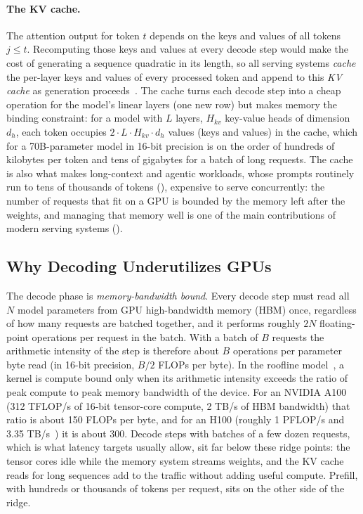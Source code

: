 \paragraph{The KV cache.}
The attention output for token $t$ depends on the keys and values of all tokens $j \le t$.
Recomputing those keys and values at every decode step would make the cost of generating a sequence quadratic in its length, so all serving systems \emph{cache} the per-layer keys and values of every processed token and append to this \emph{KV cache} as generation proceeds~\cite{pope2023efficiently,vllm}.
The cache turns each decode step into a cheap operation for the model's linear layers (one new row) but makes memory the binding constraint: for a model with $L$ layers, $H_{kv}$ key-value heads of dimension $d_h$, each token occupies $2 \cdot L \cdot H_{kv} \cdot d_h$ values (keys and values) in the cache, which for a 70B-parameter model in 16-bit precision is on the order of hundreds of kilobytes per token and tens of gigabytes for a batch of long requests.
The cache is also what makes long-context and agentic workloads, whose prompts routinely run to tens of thousands of tokens (), expensive to serve concurrently: the number of requests that fit on a GPU is bounded by the memory left after the weights, and managing that memory well is one of the main contributions of modern serving systems ().

\subsection{Why Decoding Underutilizes GPUs}
\label{background:subsec:memory_bound}

The decode phase is \emph{memory-bandwidth bound}.
Every decode step must read all $N$ model parameters from GPU high-bandwidth memory (HBM) once, regardless of how many requests are batched together, and it performs roughly $2N$ floating-point operations per request in the batch.
With a batch of $B$ requests the arithmetic intensity of the step is therefore about $B$ operations per parameter byte read (in 16-bit precision, $B/2$ FLOPs per byte).
In the roofline model~\cite{williams2009roofline}, a kernel is compute bound only when its arithmetic intensity exceeds the ratio of peak compute to peak memory bandwidth of the device.
For an NVIDIA A100 (312 TFLOP/s of 16-bit tensor-core compute, 2 TB/s of HBM bandwidth) that ratio is about 150 FLOPs per byte, and for an H100 (roughly 1 PFLOP/s and 3.35 TB/s~\cite{nvidia2022hopper}) it is about 300.
Decode steps with batches of a few dozen requests, which is what latency targets usually allow, sit far below these ridge points: the tensor cores idle while the memory system streams weights, and the KV cache reads for long sequences add to the traffic without adding useful compute.
Prefill, with hundreds or thousands of tokens per request, sits on the other side of the ridge.

